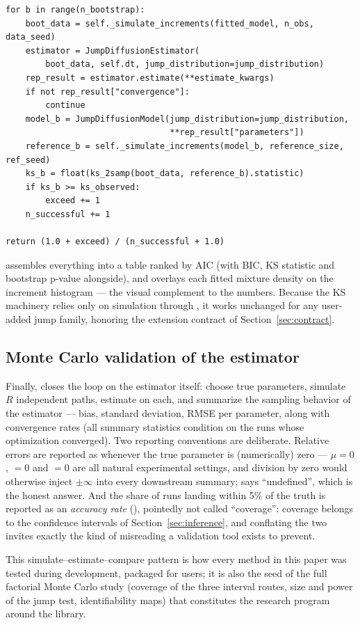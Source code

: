 \begin{lstlisting}[caption={Bootstrap KS p-value in \code{validation/distribution\_comparison.py} (excerpt).}]
for b in range(n_bootstrap):
    boot_data = self._simulate_increments(fitted_model, n_obs, data_seed)
    estimator = JumpDiffusionEstimator(
        boot_data, self.dt, jump_distribution=jump_distribution)
    rep_result = estimator.estimate(**estimate_kwargs)
    if not rep_result["convergence"]:
        continue
    model_b = JumpDiffusionModel(jump_distribution=jump_distribution,
                                 **rep_result["parameters"])
    reference_b = self._simulate_increments(model_b, reference_size, ref_seed)
    ks_b = float(ks_2samp(boot_data, reference_b).statistic)
    if ks_b >= ks_observed:
        exceed += 1
    n_successful += 1

return (1.0 + exceed) / (n_successful + 1.0)
\end{lstlisting}

 assembles everything into a table ranked by AIC (with
BIC, KS statistic and bootstrap p-value alongside), and
 overlays each fitted mixture density on the
increment histogram --- the visual complement to the numbers. Because the
KS machinery relies only on simulation through
, it works unchanged for any user-added jump
family, honoring the extension contract of Section~\ref{sec:contract}.

\subsection{Monte Carlo validation of the estimator}

Finally,  closes the loop on the estimator
itself: choose true parameters, simulate $R$ independent paths, estimate
on each, and summarize the sampling behavior of the estimator ---
bias, standard deviation, RMSE per parameter, along with convergence
rates (all summary statistics condition on the runs whose optimization
converged). Two reporting conventions are deliberate. Relative errors are
reported as  whenever the true parameter is (numerically) zero
--- $\mu = 0$,  $= 0$ and  $= 0$ are all
natural experimental settings, and division by zero would otherwise
inject $\pm\infty$ into every downstream summary;  says
``undefined'', which is the honest answer. And the share of runs landing
within 5\% of the truth is reported as an \emph{accuracy rate}
(), pointedly not called ``coverage'': coverage
belongs to the confidence intervals of Section~\ref{sec:inference}, and
conflating the two invites exactly the kind of misreading a validation
tool exists to prevent.

This simulate--estimate--compare pattern is how every method in this
paper was tested during development, packaged for users; it is also the
seed of the full factorial Monte Carlo study (coverage of the three
interval routes, size and power of the jump test, identifiability maps)
that constitutes the research program around the library.
